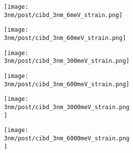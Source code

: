 \begin{figure}[!h]
\begin{subfigure}{0.5\linewidth}
	\end{subfigure}%
	\hfill
	\begin{subfigure}{0.5\linewidth}
		\begin{subfigure}{0.33\linewidth} \centering %
			\texttt{[image: 3nm/post/cibd\_3nm\_6meV\_strain.png]}			
		\end{subfigure}%
		\begin{subfigure}{0.33\linewidth} \centering %
			\texttt{[image: 3nm/post/cibd\_3nm\_60meV\_strain.png]}		
		\end{subfigure}%
		\begin{subfigure}{0.33\linewidth} \centering %
			\texttt{[image: 3nm/post/cibd\_3nm\_300meV\_strain.png]} 	
		\end{subfigure}
		\vfill
		\begin{subfigure}{0.33\linewidth} \centering %
			\texttt{[image: 3nm/post/cibd\_3nm\_600meV\_strain.png]} 	
		\end{subfigure}%
		\begin{subfigure}{0.33\linewidth} \centering %
			\texttt{[image: 3nm/post/cibd\_3nm\_3000meV\_strain.png]} 	
		\end{subfigure}%
		\begin{subfigure}{0.33\linewidth} \centering %
			\texttt{[image: 3nm/post/cibd\_3nm\_6000meV\_strain.png]} 	
		\end{subfigure}%
		\vfill
		\label{fig:cibd_single_strain3}
	\end{subfigure}%
	\label{f:clus_single-strain3}
\end{figure}

